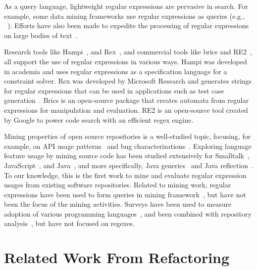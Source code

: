 As a query language, lightweight regular expressions are pervasive in search. For example,
some data mining frameworks use regular expressions as queries (e.g., ~\cite{Begel:2010:CDE:1806799.1806821}). Efforts have also been made to expedite the processing of regular expressions on large bodies of text~\cite{Baeza-Yates:1996:FTS:235809.235810}.

Research tools like Hampi~\cite{hampi}, and Rex~\cite{rex}, and commercial tools like brics\cite{brics} and RE2~\cite{re2}, all support the use of regular expressions in various ways. Hampi was developed  in academia and uses regular expressions as a specification language for a constraint solver. Rex was developed by Microsoft Research and generates strings for regular expressions that can be used in  applications such as test case generation~\cite{Anand:2013:OSM:2503903.2503991, Tillmann:2014:TAT:2642937.2642941}. Brics is an open-source package that creates automata from regular expressions for manipulation and evaluation.
RE2 is an open-source tool created by Google to power code search with an efficient regex engine.


Mining properties of open source repositories is a well-studied topic, focusing, for example, on API usage patterns~\cite{Linares-Vasquez:2014:MEA:2597073.2597085} and bug characterizations~\cite{Chen:2014:ESD:2597073.2597108}.
Exploring language feature usage by mining source code has been studied extensively for
Smalltalk~\cite{Callau:2011:DUD:1985441.1985448, Callau:2013:DUD:2589712.2589718},
JavaScript~\cite{Richards:2010:ADB:1809028.1806598},
and Java~\cite{Dyer:2014:MBA:2568225.2568295, Grechanik:2010:EIL:1852786.1852801, Parnin:2013:AUJ:2589712.2589717, Livshits:2005:RAJ:2099708.2099724},
and more specifically,
Java generics~\cite{Parnin:2013:AUJ:2589712.2589717} and
Java reflection~\cite{Livshits:2005:RAJ:2099708.2099724}.
To our knowledge, this is the first work to mine and evaluate regular expression usages from existing software repositories. Related to mining work, regular expressions have been used to form queries in mining framework~\cite{Begel:2010:CDE:1806799.1806821}, but have not been the focus of the mining activities.
Surveys have been used to measure adoption of various programming languages~\cite{Meyerovich:2013:EAP:2509136.2509515, Dattero:2004:PLG:962081.962087}, and been combined with  repository analysis~\cite{Meyerovich:2013:EAP:2509136.2509515}, but have not focused on regexes.

\section{Related Work From Refactoring}
\label{sec:relatedR}

